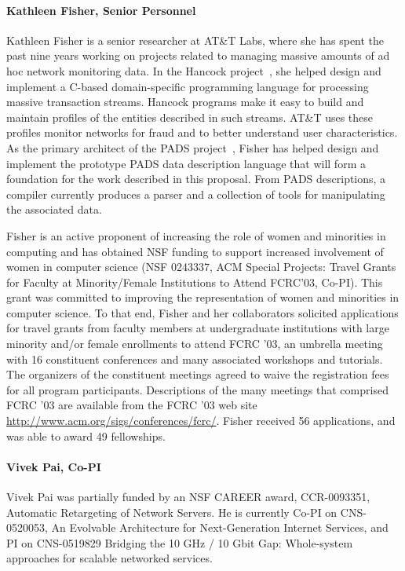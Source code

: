 \documentclass[11pt]{article}
\begin{document}
\paragraph*{Kathleen Fisher, Senior Personnel} 
Kathleen Fisher is a senior researcher at AT\&T Labs,
where she has spent the past nine years working on projects
related to managing massive amounts of ad hoc network monitoring data.
In the Hancock project~\cite{kdd00,hancock-toplas}, she helped 
design and implement a C-based
domain-specific programming language for processing massive  
transaction streams.  Hancock programs make it easy to build
and maintain profiles of the entities described in such streams. 
AT\&T uses these profiles monitor networks for fraud 
and to better understand user characteristics.
As the primary architect of the PADS project~\cite{fisher+:pads}, 
Fisher has helped design and implement the prototype PADS
data description language that will form a foundation for the work
described in this proposal.  From PADS descriptions,
a compiler currently produces a parser and a collection of tools for
manipulating the associated data.  

Fisher is an active proponent of increasing the role of women and
minorities in computing and has obtained NSF funding to support
increased involvement of women in computer science (NSF 0243337, ACM
Special Projects: Travel Grants for Faculty at Minority/Female
Institutions to Attend FCRC'03, Co-PI).  This grant was committed to
improving the representation of women and minorities in computer
science. To that end, Fisher and her collaborators 
solicited applications for travel grants from
faculty members at undergraduate institutions with large minority
and/or female enrollments to attend FCRC '03, an umbrella meeting with
16 constituent conferences and many associated workshops and
tutorials.  The organizers of the constituent meetings agreed to waive
the registration fees for all program participants.  Descriptions of
the many meetings that comprised FCRC '03 are available from the FCRC
'03 web site \url{http://www.acm.org/sigs/conferences/fcrc/}.  Fisher
received 56 applications, and was able to award 49 fellowships.

\paragraph*{Vivek Pai, Co-PI} Vivek Pai was partially funded by 
an NSF CAREER award, CCR-0093351, Automatic Retargeting of Network
Servers. He is currently Co-PI on CNS-0520053, An Evolvable
Architecture for Next-Generation Internet Services, and PI on
CNS-0519829 Bridging the 10 GHz / 10 Gbit Gap: Whole-system approaches
for scalable networked services.
\end{document}
